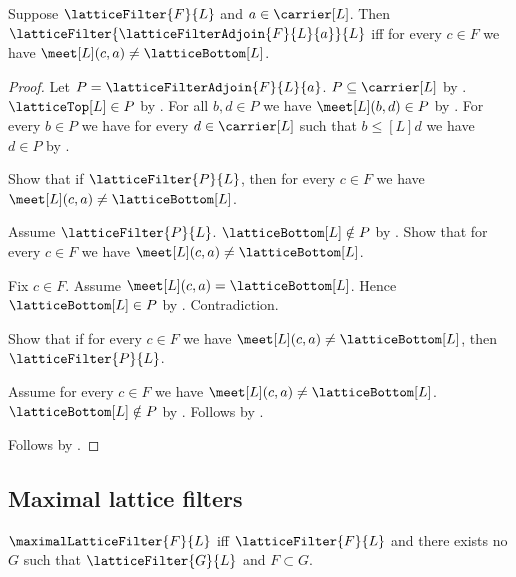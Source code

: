 \begin{theorem}\label{lattice_filter_adjoin_is_filter_iff}
    Suppose $\latticeFilter{F}{L}$ and $a\in\carrier[L]$.
    Then $\latticeFilter{\latticeFilterAdjoin{F}{L}{a}}{L}$ iff
        for every $c\in F$ we have
            $\meet[L](c,a)\neq\latticeBottom[L]$.
\end{theorem}
\begin{proof}
    Let $P=\latticeFilterAdjoin{F}{L}{a}$.
    $P\subseteq\carrier[L]$ by
        .
    $\latticeTop[L]\in P$ by .
    For all $b,d\in P$ we have $\meet[L](b,d)\in P$ by
        .
    For every $b\in P$ we have for every $d\in\carrier[L]$ such that
        $b\mathrel{\leq[L]}d$ we have $d\in P$ by
        .

    Show that if $\latticeFilter{P}{L}$, then
        for every $c\in F$ we have
            $\meet[L](c,a)\neq\latticeBottom[L]$.
    \begin{subproof}
        Assume $\latticeFilter{P}{L}$.
        $\latticeBottom[L]\notin P$ by
            .
        Show that for every $c\in F$ we have
            $\meet[L](c,a)\neq\latticeBottom[L]$.
        \begin{subproof}
            Fix $c\in F$.
            Assume $\meet[L](c,a)=\latticeBottom[L]$.
            Hence $\latticeBottom[L]\in P$ by
                .
            Contradiction.
        \end{subproof}
    \end{subproof}
    Show that if for every $c\in F$ we have
        $\meet[L](c,a)\neq\latticeBottom[L]$, then
        $\latticeFilter{P}{L}$.
    \begin{subproof}
        Assume for every $c\in F$ we have
            $\meet[L](c,a)\neq\latticeBottom[L]$.
        $\latticeBottom[L]\notin P$ by
            .
        Follows by .
    \end{subproof}
    Follows by \auto.
\end{proof}

\subsection{Maximal lattice filters}

\begin{definition}\label{maximal_lattice_filter}
    $\maximalLatticeFilter{F}{L}$ iff
        $\latticeFilter{F}{L}$ and
        there exists no $G$ such that
            $\latticeFilter{G}{L}$ and $F\subset G$.
\end{definition}


